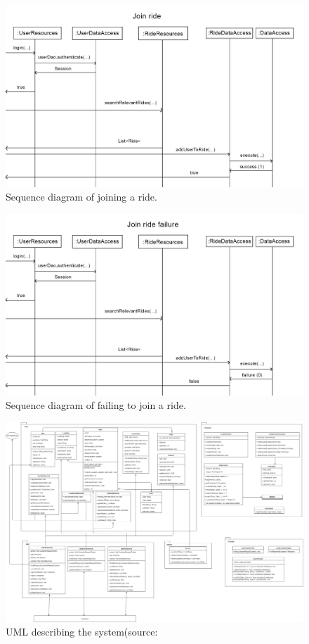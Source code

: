 \documentclass{article}
\begin{document}
\begin{figure}[h]
  \centering
  \includegraphics[scale=0.25]{seqdiagram8.png}
  \caption{Sequence diagram of joining a ride.}
  \label{fig:seq8}
\end{figure}

\begin{figure}[h]
  \centering
  \includegraphics[scale=0.25]{seqdiagram9.png}
  \caption{Sequence diagram of failing to join a ride.}
  \label{fig:seq9}
\end{figure}

\newpage
\begin{figure}[h]
  \includegraphics[scale=0.27, angle=90]{UML.png}
  \caption{UML describing the system(source: }
  \label{fig:uml}
\end{figure}
\end{document}

